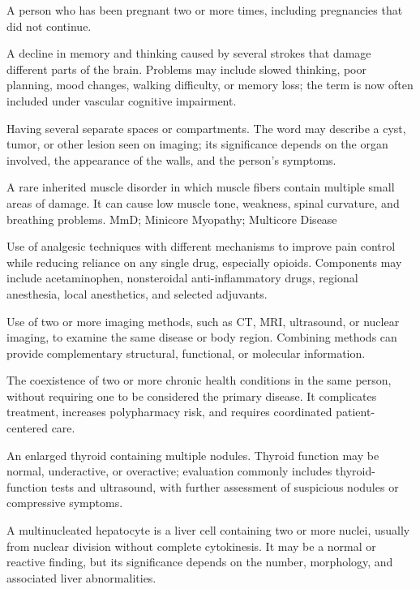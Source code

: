  A person who has been pregnant two or more times, including pregnancies that did not continue.

 A decline in memory and thinking caused by several strokes that damage different parts of the brain. Problems may include slowed thinking, poor planning, mood changes, walking difficulty, or memory loss; the term is now often included under vascular cognitive impairment.

 Having several separate spaces or compartments. The word may describe a cyst, tumor, or other lesion seen on imaging; its significance depends on the organ involved, the appearance of the walls, and the person's symptoms.

 A rare inherited muscle disorder in which muscle fibers contain multiple small areas of damage. It can cause low muscle tone, weakness, spinal curvature, and breathing problems.
\synonyms
MmD; Minicore Myopathy; Multicore Disease

 Use of analgesic techniques with different mechanisms to improve pain control while
reducing reliance on any single drug, especially opioids. Components may include
acetaminophen, nonsteroidal anti-inflammatory drugs, regional anesthesia, local
anesthetics, and selected adjuvants.

 Use of two or more imaging methods, such as CT, MRI, ultrasound, or nuclear imaging, to examine the same disease or body region. Combining methods can provide complementary structural, functional, or molecular information.

 The coexistence of two or more chronic health conditions in the same person, without
requiring one to be considered the primary disease. It complicates treatment, increases
polypharmacy risk, and requires coordinated patient-centered care.

 An enlarged thyroid containing multiple nodules. Thyroid function may be normal, underactive, or overactive; evaluation commonly includes thyroid-function tests and ultrasound, with further assessment of suspicious nodules or compressive symptoms.

 A multinucleated hepatocyte is a liver cell containing two or more nuclei, usually from nuclear division without complete cytokinesis. It may be a normal or reactive finding, but its significance depends on the number, morphology, and associated liver abnormalities.

